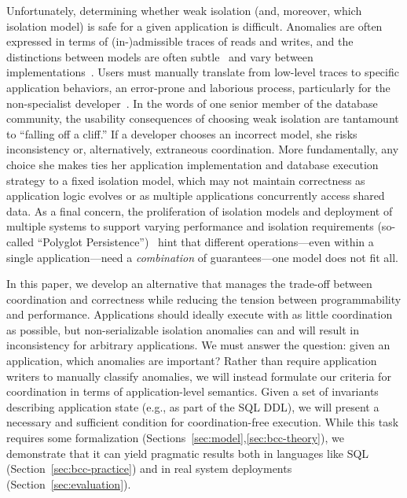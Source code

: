 Unfortunately, determining whether weak isolation (and, moreover,
which isolation model) is safe for a given application is
difficult. Anomalies are often expressed in terms of (in-)admissible
traces of reads and writes, and the distinctions between models are
often subtle~\cite{adya-isolation,isolation-semantics} and vary
between implementations~\cite{hat-vldb}. Users must manually translate
from low-level traces to specific application behaviors, an
error-prone and laborious process, particularly for the non-specialist
developer~\cite{consistency-borders}. In the words of one senior
member of the database community, the usability consequences of
choosing weak isolation are tantamount to ``falling off a cliff.'' If a
developer chooses an incorrect model, she risks inconsistency or,
alternatively, extraneous coordination. More fundamentally, any choice
she makes ties her application implementation and database execution
strategy to a fixed isolation model, which may not maintain
correctness as application logic evolves or as multiple applications
concurrently access shared data. As a final concern, the proliferation
of isolation models and deployment of multiple systems to support
varying performance and isolation requirements (so-called ``Polyglot
Persistence'')~\cite{polyglot} hint that different operations---even
within a single application---need a \textit{combination} of
guarantees---one model does not fit all.



 In this paper, we develop
an alternative that manages the trade-off between coordination and
correctness while reducing the tension between programmability and
performance. Applications should ideally execute with as little
coordination as possible, but non-serializable isolation anomalies can
and will result in inconsistency for arbitrary applications. We must
answer the question: given an application, which anomalies are
important? Rather than require application writers to manually
classify anomalies, we will instead formulate our criteria for
coordination in terms of application-level semantics. Given a set of
invariants describing application state (e.g., as part of the SQL
DDL), we will present a necessary and sufficient condition for
coordination-free execution. While this task requires some
formalization (Sections~\ref{sec:model},\ref{sec:bcc-theory}), we
demonstrate that it can yield pragmatic results both in languages like
SQL (Section~\ref{sec:bcc-practice}) and in real system deployments
(Section~\ref{sec:evaluation}).



